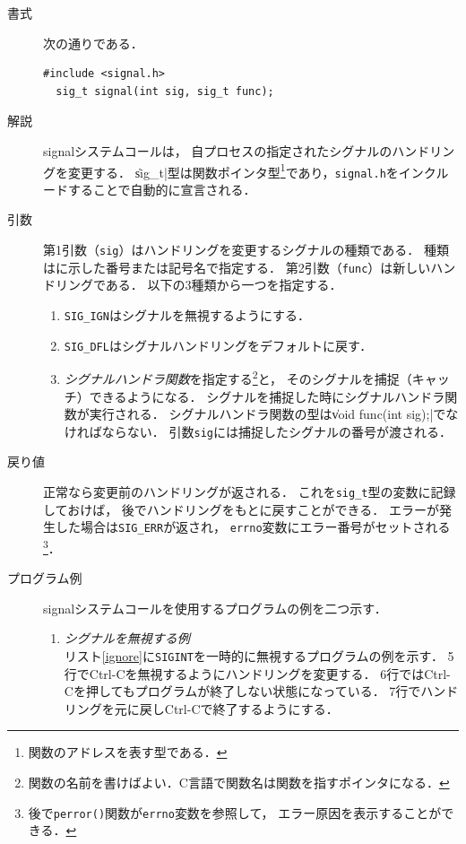 \begin{description}
\item[書式] 次の通りである．
\begin{lstlisting}[numbers=none]
  #include <signal.h>
  sig_t signal(int sig, sig_t func);
\end{lstlisting}

\item[解説]
  signalシステムコールは，
  自プロセスの指定されたシグナルのハンドリングを変更する．
  \|sig_t|型は関数ポインタ型\footnote{
    関数のアドレスを表す型である．
  }であり，\texttt{signal.h}をインクルードすることで自動的に宣言される．

\item[引数]
  第1引数（\texttt{sig}）はハンドリングを変更するシグナルの種類である．
  種類はに示した番号または記号名で指定する．
  第2引数（\texttt{func}）は新しいハンドリングである．
  以下の3種類から一つを指定する．

  \begin{enumerate}
  \item \texttt{SIG\_IGN}はシグナルを無視するようにする．
  \item \texttt{SIG\_DFL}はシグナルハンドリングをデフォルトに戻す．
  \item \emph{シグナルハンドラ関数}を指定する\footnote{
    関数の名前を書けばよい．C言語で関数名は関数を指すポインタになる．}と，
    そのシグナルを捕捉（キャッチ）できるようになる．
    シグナルを捕捉した時にシグナルハンドラ関数が実行される．
    シグナルハンドラ関数の型は\|void func(int sig);|でなければならない．
    引数\texttt{sig}には捕捉したシグナルの番号が渡される．
  \end{enumerate}

\item[戻り値]
  正常なら変更前のハンドリングが返される．
  これを\texttt{sig\_t}型の変数に記録しておけば，
  後でハンドリングをもとに戻すことができる．
  エラーが発生した場合は\texttt{SIG\_ERR}が返され，
  \texttt{errno}変数にエラー番号がセットされる\footnote{
    後で\texttt{perror()}関数が\texttt{errno}変数を参照して，
    エラー原因を表示することができる．}．

\item[プログラム例] signalシステムコールを使用するプログラムの例を二つ示す．
  \begin{enumerate}
  \item \emph{シグナルを無視する例} \\
    リスト\ref{ignore}に\texttt{SIGINT}を一時的に無視するプログラムの例を示す．
    5行でCtrl-Cを無視するようにハンドリングを変更する．
    6行ではCtrl-Cを押してもプログラムが終了しない状態になっている．
    7行でハンドリングを元に戻しCtrl-Cで終了するようにする．


\end{enumerate}
\end{description}

